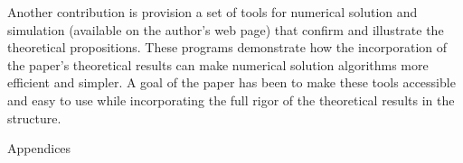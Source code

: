 \documentclass[titlepage]{\econtex}\providecommand{\texname}{BufferStockTheory}%
\begin{document}
\begin{comment}
Beyond their intrinsic value, the techniques developed here may be
useful for a variety of further purposes.  For instance,
Carroll~\citeyearpar{carroll:mpcperm} uses these techniques to prove that the
marginal propensity to consume out of permanent income shocks is
strictly less than 1 in models of this type.  This is a proposition
that could be important for fiscal policy analysis, the analysis of
income distribution dynamics and inequality, and many other questions.
\end{comment}

Another contribution is provision a set of tools for numerical
solution and simulation (available on the author's web page) that
confirm and illustrate the theoretical propositions.  These programs
demonstrate how the incorporation of the paper's theoretical results
can make numerical solution algorithms more efficient and simpler.  A
goal of the paper has been to make these tools accessible and easy to
use while incorporating the full rigor of the theoretical results in
the structure.


\clearpage\vfill\eject

\appendix

\centerline{\LARGE Appendices}\vspace{0.2in}

\begin{comment}
\section{$\mRat$ Growth in the Perfect Foresight Model} \label{sec:mGrowthPF}

To see why the constraint is irrelevant if
\eqref{eq:PFGIC} fails, recall that for the unconstrained case when
both the FHWC and RIC hold the optimal solution is $\cLev_{t} =
(1-\PatR)(\mLev_{t}+\hLev_{t}-\pLev_{t})$, and that
$\cLev_{t+1} = {\Pat} \cLev_{t}$; combining these
we have
\begin{eqnarray*}
    \mLev_{t+1} & = & \Rfree(\mLev_{t}-\cLev_{t}) + \PGro \pLev_{t}\\
  & = & {\Pat}\mLev_{t} + \PGro \pLev_{t} - (1-\PatR)(\hLev_{t}-\pLev_{t}) \Rfree
\\ \mRat_{t+1}\PGro & = & {\Pat}\mRat_{t} + \bullet
\\ \mRat_{t+1} & = & \left(\frac{{\Pat}}{\PGro}\right)\mRat_{t} + \bullet/\PGro
\end{eqnarray*}
for some $\bullet$ which can be shown to be positive.
\end{comment}
\end{document}
